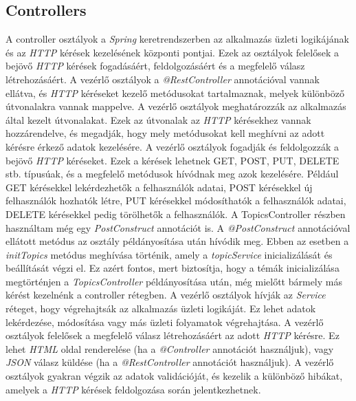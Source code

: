 \subsection{Controllers}


A controller osztályok a \textit{Spring} keretrendszerben az alkalmazás üzleti logikájának és az \textit{HTTP} kérések kezelésének központi pontjai. Ezek az osztályok felelősek a bejövő \textit{HTTP} kérések fogadásáért, feldolgozásáért és a megfelelő válasz létrehozásáért. A vezérlő osztályok a \textit{@RestController} annotációval vannak ellátva, és \textit{HTTP} kéréseket kezelő metódusokat tartalmaznak, melyek különböző útvonalakra vannak mappelve. A vezérlő osztályok meghatározzák az alkalmazás által kezelt útvonalakat. Ezek az útvonalak az \textit{HTTP} kérésekhez vannak hozzárendelve, és megadják, hogy mely metódusokat kell meghívni az adott kérésre érkező adatok kezelésére. A vezérlő osztályok fogadják és feldolgozzák a bejövő \textit{HTTP} kéréseket. Ezek a kérések lehetnek GET, POST, PUT, DELETE stb. típusúak, és a megfelelő metódusok hívódnak meg azok kezelésére. Például GET kérésekkel lekérdezhetők a felhasználók adatai, POST kérésekkel új felhasználók hozhatók létre, PUT kérésekkel módosíthatók a felhasználók adatai, DELETE kérésekkel pedig törölhetők a felhasználók. A TopicsController részben használtam még egy \textit{PostConstruct} annotációt is. A \textit{@PostConstruct} annotációval ellátott metódus az osztály példányosítása után hívódik meg. Ebben az esetben a \textit{initTopics} metódus meghívása történik, amely a \textit{topicService} inicializálását és beállítását végzi el. Ez azért fontos, mert biztosítja, hogy a témák inicializálása megtörténjen a \textit{TopicsController} példányosítása után, még mielőtt bármely más kérést kezelnénk a controller rétegben. A vezérlő osztályok hívják az \textit{Service} réteget, hogy végrehajtsák az alkalmazás üzleti logikáját. Ez lehet adatok lekérdezése, módosítása vagy más üzleti folyamatok végrehajtása. A vezérlő osztályok felelősek a megfelelő válasz létrehozásáért az adott \textit{HTTP} kérésre. Ez lehet \textit{HTML} oldal renderelése (ha a \textit{@Controller} annotációt használjuk), vagy \textit{JSON} válasz küldése (ha a \textit{@RestController} annotációt használjuk). A vezérlő osztályok gyakran végzik az adatok validációját, és kezelik a különböző hibákat, amelyek a \textit{HTTP} kérések feldolgozása során jelentkezhetnek.

